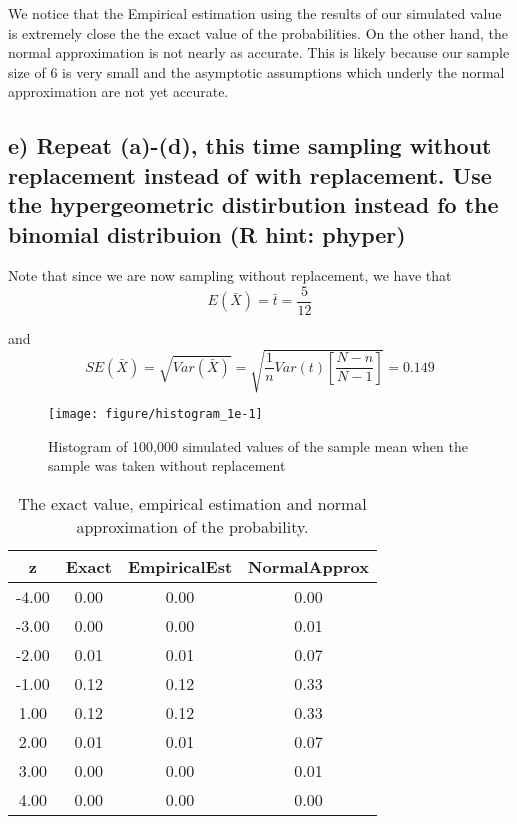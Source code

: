 \documentclass[11pt]{article}\usepackage[]{graphicx}\usepackage[]{color}
\makeatletter
\def\maxwidth{ %
  \ifdim\Gin@nat@width>\linewidth
    \linewidth
  \else
    \Gin@nat@width
  \fi
}
\newenvironment{knitrout}{}{} %
\makeatother
\begin{document}
\noindent We notice that the Empirical estimation using the results of our simulated value is extremely close the the exact value of the probabilities. On the other hand, the normal approximation is not nearly as accurate. This is likely because our sample size of 6 is very small and the asymptotic assumptions which underly the normal approximation are not yet accurate.



\subsection*{e) Repeat (a)-(d), this time sampling without replacement instead of with replacement. Use the hypergeometric distirbution instead fo the binomial distribuion (R hint: phyper)}


\noindent Note that since we are now sampling without replacement, we have that
$$E(\bar{X}) = \bar{t} = \frac{5}{12}$$

\noindent and
$$SE(\bar{X}) = \sqrt{Var(\bar{X})} = \sqrt{\frac{1}{n} Var(t) \left[\frac{N - n}{N - 1}\right]} = 0.149$$


\begin{knitrout}
\color{fgcolor}\begin{figure}[H]

{\centering \texttt{[image: figure/histogram\_1e-1]} 

}

\caption[Histogram of 100,000 simulated values of the sample mean when the sample was taken without replacement]{Histogram of 100,000 simulated values of the sample mean when the sample was taken without replacement}\label{fig:histogram_1e}
\end{figure}


\end{knitrout}

\begin{table}[H]
\centering
\begin{tabular}{|c|ccc|}
  \hline
z & Exact & EmpiricalEst & NormalApprox \\ 
  \hline
-4.00 & 0.00 & 0.00 & 0.00 \\ 
  -3.00 & 0.00 & 0.00 & 0.01 \\ 
  -2.00 & 0.01 & 0.01 & 0.07 \\ 
  -1.00 & 0.12 & 0.12 & 0.33 \\ 
  1.00 & 0.12 & 0.12 & 0.33 \\ 
  2.00 & 0.01 & 0.01 & 0.07 \\ 
  3.00 & 0.00 & 0.00 & 0.01 \\ 
  4.00 & 0.00 & 0.00 & 0.00 \\ 
   \hline
\end{tabular}
\caption{The exact value, empirical estimation and normal approximation of the probability.} 
\end{table}
\end{document}
